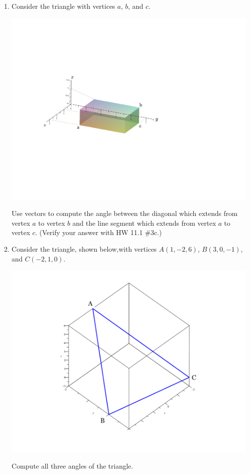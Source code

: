 \documentclass[12pt]{article}
\newif\ifans
\begin{document}
\begin{enumerate}
\newpage

\item Consider the triangle with vertices $a$, $b$, and $c$.
\begin{center}
\includegraphics[scale=0.6]{box.pdf}
\end{center}
Use vectors to compute the angle between the diagonal which extends from vertex $a$ to vertex $b$ and the line segment which extends from vertex $a$ to vertex $c$. (Verify your answer with HW 11.1 \#3c.)

\ifans{\fbox{$\cos^{-1}\left(\frac{\sqrt{13}}{\sqrt{14}}\right)$}} \fi

\item Consider the triangle, shown below,with vertices $A(1,-2,6)$, $B(3,0,-1)$, and $C(-2,1,0)$.
\begin{center}
\includegraphics[scale=0.5]{triangle.pdf}
\end{center}
Compute all three angles of the triangle.


\end{enumerate}
\end{document}
